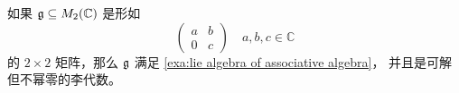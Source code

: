 \begin{proposition}
  如果 $\mathfrak{g}\subseteq  M_2(\mathbb{C})$ 是形如
  \[
    \begin{pmatrix}
      a & b \\ 0 & c
    \end{pmatrix}\quad a,b,c\in \mathbb{C}
  \]
  的 $2\times 2$ 矩阵，那么 $\mathfrak{g}$ 满足 \autoref{exa:lie algebra of associative algebra}，
  并且是可解但不幂零的李代数。
\end{proposition}







 





